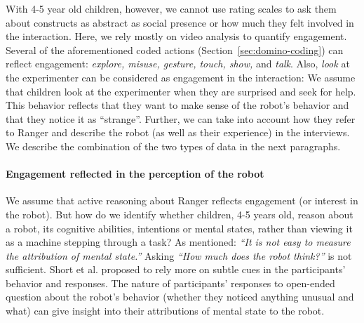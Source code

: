 \documentclass{sig-alternate}
\begin{document}

With 4-5 year old children, however, we cannot use rating scales to ask them
about constructs as abstract as social presence or how much they felt involved
in the interaction. Here, we rely mostly on video analysis to quantify
engagement. Several of the aforementioned coded actions
(Section~\ref{sec:domino-coding}) can reflect engagement: \textit{explore,
misuse, gesture, touch, show,} and \textit{talk}. Also, \textit{look} at the
experimenter can be considered as engagement in the interaction: We assume that
children look at the experimenter when they are surprised and seek for help.
This behavior reflects that they want to make sense of the robot's behavior and
that they notice it as ``strange''. Further, we can take into account how they
refer to Ranger and describe the robot (as well as their experience) in the
interviews. We describe the combination of the two types of data in the next
paragraphs.


\paragraph{Engagement reflected in the perception of the robot}

We assume that active reasoning about Ranger reflects engagement (or interest in
the robot). But how do we identify whether children, 4-5 years old, reason about
a robot, its cognitive abilities, intentions or mental states, rather than
viewing it as a machine stepping through a task? As \cite{short_no_2010}
mentioned: \textit{``It is not easy to measure the attribution of mental
state.''} Asking \textit{``How much does the robot think?''} is not sufficient.
Short et al. proposed to rely more on subtle cues in the participants' behavior
and responses. The nature of participants' responses to open-ended question
about the robot's behavior (whether they noticed anything unusual and what) can
give insight into their attributions of mental state to the robot.

\end{document}
